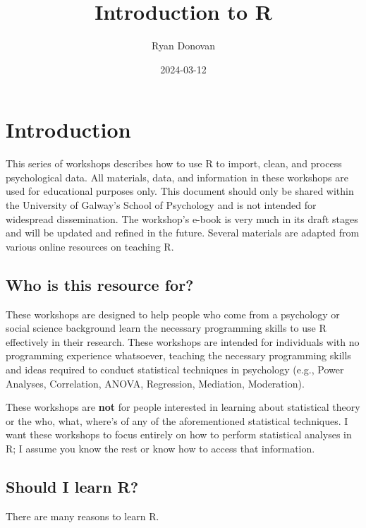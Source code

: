 \documentclass[
]{book}
\title{Introduction to R}
\author{Ryan Donovan}
\date{2024-03-12}
\begin{document}
\maketitle

{
\setcounter{tocdepth}{1}
\tableofcontents
}
\hypertarget{introduction}{%
\chapter{\texorpdfstring{\textbf{Introduction}}{Introduction}}\label{introduction}}

This series of workshops describes how to use R to import, clean, and process psychological data. All materials, data, and information in these workshops are used for educational purposes only. This document should only be shared within the University of Galway's School of Psychology and is not intended for widespread dissemination. The workshop's e-book is very much in its draft stages and will be updated and refined in the future. Several materials are adapted from various online resources on teaching R.

\hypertarget{who-is-this-resource-for}{%
\section{Who is this resource for?}\label{who-is-this-resource-for}}

These workshops are designed to help people who come from a psychology or social science background learn the necessary programming skills to use R effectively in their research. These workshops are intended for individuals with no programming experience whatsoever, teaching the necessary programming skills and ideas required to conduct statistical techniques in psychology (e.g., Power Analyses, Correlation, ANOVA, Regression, Mediation, Moderation).

These workshops are \textbf{not} for people interested in learning about statistical theory or the who, what, where's of any of the aforementioned statistical techniques. I want these workshops to focus entirely on how to perform statistical analyses in R; I assume you know the rest or know how to access that information.

\hypertarget{should-i-learn-r}{%
\section{Should I learn R?}\label{should-i-learn-r}}

There are many reasons to learn R.
\end{document}

